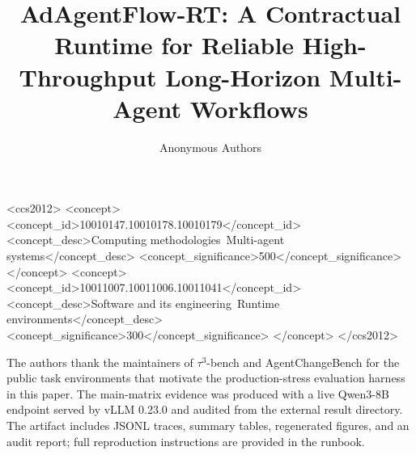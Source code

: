 \documentclass[sigconf]{acmart}
\title{AdAgentFlow-RT: A Contractual Runtime for Reliable High-Throughput Long-Horizon Multi-Agent Workflows}
\author{Anonymous Authors}
\affiliation{\institution{Anonymous Institution}\country{}}
\begin{document}
\begin{abstract}

\end{abstract}

\begin{CCSXML}
<ccs2012>
 <concept>
  <concept_id>10010147.10010178.10010179</concept_id>
  <concept_desc>Computing methodologies~Multi-agent systems</concept_desc>
  <concept_significance>500</concept_significance>
 </concept>
 <concept>
  <concept_id>10011007.10011006.10011041</concept_id>
  <concept_desc>Software and its engineering~Runtime environments</concept_desc>
  <concept_significance>300</concept_significance>
 </concept>
</ccs2012>
\end{CCSXML}


\maketitle











\begin{acks}
The authors thank the maintainers of \mbox{$\tau^3$}-bench and AgentChangeBench for the public task environments that motivate the production-stress evaluation harness in this paper. The main-matrix evidence was produced with a live Qwen3-8B endpoint served by vLLM 0.23.0 and audited from the external result directory. The artifact includes JSONL traces, summary tables, regenerated figures, and an audit report; full reproduction instructions are provided in the runbook.
\end{acks}



\end{document}
